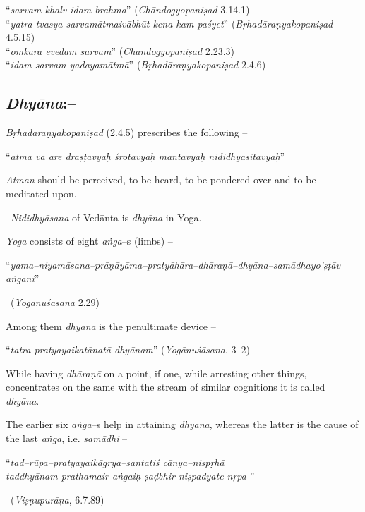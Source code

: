\begin{myquote}
“\textit{sarvam khalv idam brahma}” (\textit{Chāndogyopaniṣad} 3.14.1)\\ “\textit{yatra tvasya sarvamātmaivābhūt kena kam paśyet}” (\textit{Bṛhadāraṇyakopaniṣad} 4.5.15)\\ “\textit{omkāra evedam sarvam}” (\textit{Chāndogyopaniṣad} 2.23.3)\\ “\textit{idam sarvam yadayamātmā}” (\textit{Bṛhadāraṇyakopaniṣad} 2.4.6)
\end{myquote}


\subsection*{\textit{Dhyāna}:–}

\textit{Bṛhadāraṇyakopaniṣad} (2.4.5) prescribes the following –

\begin{myquote}
“\textit{ātmā vā are draṣṭavyaḥ śrotavyaḥ mantavyaḥ nididhyāsitavyaḥ}”
\end{myquote}

\textit{Ātman} should be perceived, to be heard, to be pondered over and to be meditated upon.

 \textit{Nididhyāsana} of Vedānta is \textit{dhyāna} in Yoga.

\textit{Yoga} consists of eight \textit{aṅga}–s (limbs) –

\begin{myquote}
“\textit{yama–niyamāsana–prāṇāyāma–pratyāhāra–dhāraṇā–dhyāna–samādhayo’ṣṭāv aṅgāni}” 

~\hfill (\textit{Yogānuśāsana} 2.29)
\end{myquote}

Among them \textit{dhyāna} is the penultimate device –

\begin{myquote}
“\textit{tatra pratyayaikatānatā dhyānam}” (\textit{Yogānuśāsana}, 3–2)
\end{myquote}

While having \textit{dhāraṇā} on a point, if one, while arresting other things, concentrates on the same with the stream of similar cognitions it is called \textit{dhyāna}.

The earlier six \textit{aṅga}–s help in attaining \textit{dhyāna}, whereas the latter is the cause of the last \textit{aṅga}, i.e. \textit{samādhi} –

\begin{myquote}
“\textit{tad–rūpa–pratyayaikāgrya–santatiś cānya–nispṛhā }\\\textit{taddhyānam prathamair aṅgaiḥ ṣaḍbhir niṣpadyate nṛpa} ” 

~\hfill (\textit{Viṣṇupurāṇa}, 6.7.89)
\end{myquote}

